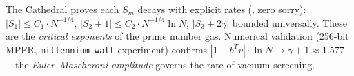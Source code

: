 The Cathedral proves each $S_m$ decays with explicit rates
(, zero sorry):
$|S_1| \leq C_1 \cdot N^{-1/4}$,
$|S_2 + 1| \leq C_2 \cdot N^{-1/4} \ln N$,
$|S_3 + 2\gamma|$ bounded universally.
These are the \emph{critical exponents} of the prime number gas.
Numerical validation (256-bit MPFR, \texttt{millennium-wall} experiment)
confirms $|1 - b^T v| \cdot \ln N \to \gamma + 1 \approx 1.577$---the
\emph{Euler--Mascheroni amplitude} governs the rate of vacuum screening.

